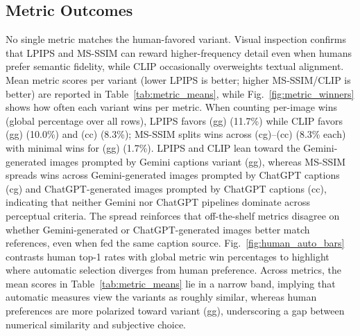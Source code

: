\documentclass[conference]{IEEEtran}
\begin{document}
\begin{table}[htb]
  \centering
  \caption{Per-image inter-rater agreement (Kendall's $W$); mean $\bar{W}=0.40$.}
  \label{tab:kendall_w}
  {\scriptsize\setlength{\tabcolsep}{2pt}\renewcommand{\arraystretch}{0.9}%
  }
\end{table}
 
\subsection{Metric Outcomes}
No single metric matches the human-favored variant. Visual inspection confirms that LPIPS and MS-SSIM can reward higher-frequency detail even when humans prefer semantic fidelity, while CLIP occasionally overweights textual alignment. Mean metric scores per variant (lower LPIPS is better; higher MS-SSIM/CLIP is better) are reported in Table~\ref{tab:metric_means}, while Fig.~\ref{fig:metric_winners} shows how often each variant wins per metric. When counting per-image wins (global percentage over all rows), LPIPS favors (gg) (11.7\%) while CLIP favors (gg) (10.0\%) and (cc) (8.3\%); MS-SSIM splits wins across (cg)--(cc) (8.3\% each) with minimal wins for (gg) (1.7\%).
    LPIPS and CLIP lean toward the Gemini-generated images prompted by Gemini captions variant (gg), whereas MS-SSIM spreads wins across Gemini-generated images prompted by ChatGPT captions (cg) and ChatGPT-generated images prompted by ChatGPT captions (cc), indicating that neither Gemini nor ChatGPT pipelines dominate across perceptual criteria. The spread reinforces that off-the-shelf metrics disagree on whether Gemini-generated or ChatGPT-generated images better match references, even when fed the same caption source.
    Fig.~\ref{fig:human_auto_bars} contrasts human top-1 rates with global metric win percentages to highlight where automatic selection diverges from human preference.
    Across metrics, the mean scores in Table~\ref{tab:metric_means} lie in a narrow band, implying that automatic measures view the variants as roughly similar, whereas human preferences are more polarized toward variant (gg), underscoring a gap between numerical similarity and subjective choice.
\end{document}
